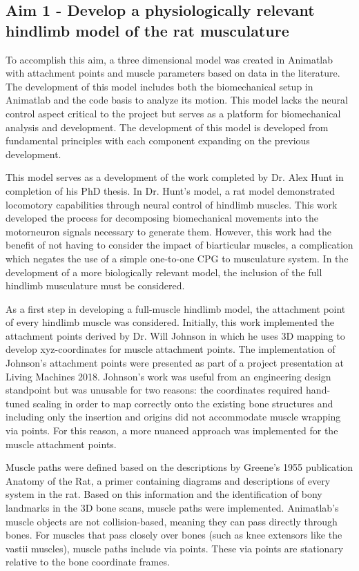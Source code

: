 \documentclass[runningheads,a4paper]{llncs}
\begin{document}
\subsection{Aim 1 - Develop a physiologically relevant hindlimb model of the rat musculature}
To accomplish this aim, a three dimensional model was created in Animatlab with attachment points and muscle parameters based on data in the literature. The development of this model includes both the biomechanical setup in Animatlab and the code basis to analyze its motion. This model lacks the neural control aspect critical to the project but serves as a platform for biomechanical analysis and development. The development of this model is developed from fundamental principles with each component expanding on the previous development. \par
This model serves as a development of the work completed by Dr. Alex Hunt in completion of his PhD thesis\cite{hunt_development_2017}\cite{hunt_neuromechanical_2014}\cite{hunt_using_2015}. In Dr. Hunt's model, a rat model demonstrated locomotory capabilities through neural control of hindlimb muscles. This work developed the process for decomposing biomechanical movements into the motorneuron signals necessary to generate them. However, this work had the benefit of not having to consider the impact of biarticular muscles, a complication which negates the use of a simple one-to-one CPG to musculature system. In the development of a more biologically relevant model, the inclusion of the full hindlimb musculature must be considered. \par
As a first step in developing a full-muscle hindlimb model, the attachment point of every hindlimb muscle was considered. Initially, this work implemented the attachment points derived by Dr. Will Johnson\cite{johnson_three-dimensional_2008} in which he uses 3D mapping to develop xyz-coordinates for muscle attachment points. The implementation of Johnson’s attachment points were presented as part of a project presentation at Living Machines 2018\cite{young_neuromechanical_2018}. Johnson’s work was useful from an engineering design standpoint but was unusable for two reasons: the coordinates required hand-tuned scaling in order to map correctly onto the existing bone structures and including only the insertion and origins did not accommodate muscle wrapping via points. For this reason, a more nuanced approach was implemented for the muscle attachment points. \par
Muscle paths were defined based on the descriptions by Greene’s 1955 publication Anatomy of the Rat\cite{greene_anatomy_1955}, a primer containing diagrams and descriptions of every system in the rat. Based on this information and the identification of bony landmarks in the 3D bone scans, muscle paths were implemented. Animatlab’s muscle objects are not collision-based, meaning they can pass directly through bones. For muscles that pass closely over bones (such as knee extensors like the vastii muscles), muscle paths include via points. These via points are stationary relative to the bone coordinate frames. \par
\end{document}

